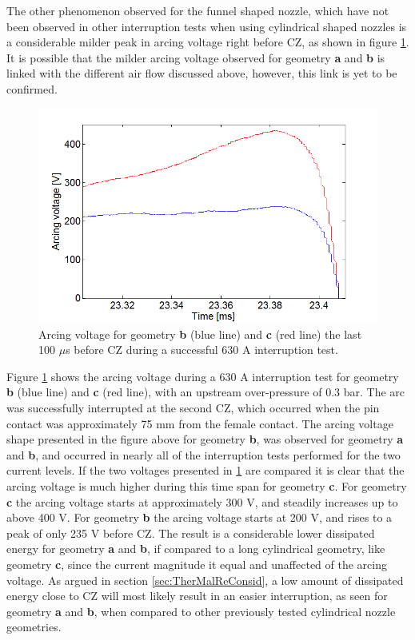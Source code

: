 \documentclass[10pt,b5paper,twoside]{article}
\begin{document}
The other phenomenon observed for the funnel shaped nozzle, which have not been observed in other interruption tests when using cylindrical shaped nozzles is a considerable milder peak in arcing voltage right before CZ, as shown in figure \ref{fig:mildFunnelArcVlotage}. It is possible that the milder arcing voltage observed for geometry \textbf{a} and \textbf{b} is linked with the different air flow discussed above, however, this link is yet to be confirmed.

\begin{figure}[H]
\centering
\includegraphics[scale=0.5]{Bilder/Results/arcingVoltageFunnelandCylinderBandC.png}
\caption{Arcing voltage for geometry \textbf{b} (blue line) and \textbf{c} (red line) the last 100 $\mu$s before CZ during a successful 630 A interruption test.} \label{fig:mildFunnelArcVlotage}
\end{figure}

Figure \ref{fig:mildFunnelArcVlotage} shows the arcing voltage during a 630 A interruption test for geometry \textbf{b} (blue line) and \textbf{c} (red line), with an upstream over-pressure of 0.3 bar. The arc was successfully interrupted at the second CZ, which occurred when the pin contact was approximately 75 mm from the female contact. The arcing voltage shape presented in the figure above for geometry \textbf{b}, was observed for geometry \textbf{a} and \textbf{b}, and occurred in nearly all of the interruption tests performed for the two current levels. If the two voltages presented in \ref{fig:mildFunnelArcVlotage} are compared it is clear that the arcing voltage is much higher during this time span for geometry \textbf{c}. For geometry \textbf{c} the arcing voltage starts at approximately 300 V, and steadily increases up to above 400 V. For geometry \textbf{b} the arcing voltage starts at 200 V, and rises to a peak of only 235 V before CZ. The result is a considerable lower dissipated energy for geometry \textbf{a} and \textbf{b}, if compared to a long cylindrical geometry, like geometry \textbf{c}, since the current magnitude it equal and unaffected of the arcing voltage. As argued in section \ref{sec:TherMalReConsid}, a low amount of dissipated energy close to CZ will most likely result in an easier interruption, as seen for geometry \textbf{a} and \textbf{b}, when compared to other previously tested cylindrical nozzle geometries.
\end{document}
